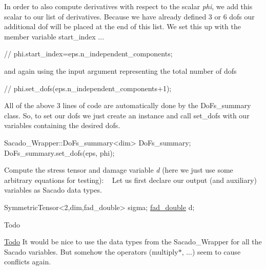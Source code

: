 In order to also compute derivatives with respect to the scalar {\itshape phi}, we add this scalar to our list of derivatives. Because we have already defined 3 or 6 dofs our additional dof will be placed at the end of this list. We set this up with the member variable start\+\_\+index ... 
\begin{DoxyCode}
\textcolor{comment}{//    phi.start\_index=eps.n\_independent\_components;}
\end{DoxyCode}
 and again using the input argument representing the total number of dofs 
\begin{DoxyCode}
\textcolor{comment}{//    phi.set\_dofs(eps.n\_independent\_components+1);}
\end{DoxyCode}
 All of the above 3 lines of code are automatically done by the Do\+Fs\+\_\+summary class. So, to set our dofs we just create an instance and call set\+\_\+dofs with our variables containing the desired dofs. 
\begin{DoxyCode}
Sacado\_Wrapper::DoFs\_summary<dim> DoFs\_summary;
DoFs\_summary.set\_dofs(eps, phi);
\end{DoxyCode}
 Compute the stress tensor and damage variable {\itshape d} (here we just use some arbitrary equations for testing)\+: ~\newline
Let us first declare our output (and auxiliary) variables as Sacado data types. 
\begin{DoxyCode}
SymmetricTensor<2,dim,fad\_double> sigma;
\hyperlink{example__code__to__be__documented_8cc_a868b94676739e612d9c95940e70892a9}{fad\_double} d;
\end{DoxyCode}
 \begin{DoxyRefDesc}{Todo}
\item[\hyperlink{todo__todo000008}{Todo}]It would be nice to use the data types from the Sacado\+\_\+\+Wrapper for all the Sacado variables. But somehow the operators (multiply$\ast$, ...) seem to cause conflicts again.\end{DoxyRefDesc}


